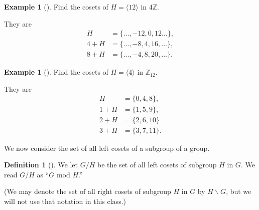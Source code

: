\documentclass[10pt,]{book}
\theoremstyle{plain}
\theoremstyle{definition}
\newtheorem{definition}[theorem]{Definition}
\theoremstyle{definition}
\theoremstyle{definition}
\newtheorem{example}[theorem]{Example}
\theoremstyle{definition}
\numberwithin{equation}{section}
\def\Z{\mathbb{Z}}
\newcommand{\amp}{&}
\begin{document}
\begin{example}[]\label{example-73}
Find the cosets of \(H=\langle 12\rangle\) in \(4\Z\).%
\par
They are%
\begin{align*}
H\amp =\{\ldots, -12,0,12\ldots\},\\
4+H \amp =
\{\ldots,-8,4,16,\ldots\},\\
8+H\amp =\{\ldots, -4,8,20,\ldots\}.
\end{align*}
%
\end{example}
\begin{example}[]\label{z6_ex}
Find the cosets of \(H=\langle 4\rangle\) in \(\Z_{12}\).%
\par
They are%
\begin{align*}
H\amp =\{0,4,8\},\\
1+H \amp = \{1,5,9\},\\
2+H\amp =\{2,6,10\}\\
3+H\amp =\{3,7,11\}.
\end{align*}
%
\end{example}
We now consider the set of all left cosets of a subgroup of a group.%
\begin{definition}[{}]\label{definition-64}
\label{notation-72}
We let \(G/H\) be the set of all left cosets of subgroup \(H\) in \(G\). We read \(G/H\) as ``\(G\) mod \(H\).''%
\par
(We may denote the set of all right cosets of subgroup \(H\) in \(G\) by \(H\backslash G\), but we will  not use that notation in this class.)%
\end{definition}
\typeout{************************************************}
\typeout{************************************************}
\end{document}
